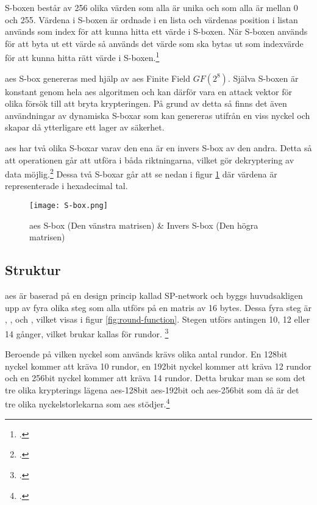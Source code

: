 S-boxen består av 256 olika värden som alla är unika och som alla är mellan 0 och 255.
Värdena i S-boxen är ordnade i en lista och värdenas position i listan används som
index för att kunna hitta ett värde i S-boxen. När S-boxen används för att byta ut
ett värde så används det värde som ska bytas ut som indexvärde för att kunna hitta
rätt värde i S-boxen.\footcite{sbox_wiki}

\acrshort{aes} S-box genereras med hjälp av \acrshort{aes} Finite Field {$GF(2^8)$}.
Själva S-boxen är konstant genom hela \acrshort{aes} algoritmen och kan därför
vara en attack vektor för olika försök till att bryta krypteringen. På grund av
detta så finns det även användningar av dynamiska S-boxar som kan genereras
utifrån en viss nyckel och skapar då ytterligare ett lager av säkerhet.

\acrshort{aes} har två olika S-boxar varav den ena är en invers S-box av den andra.
Detta så att operationen går att utföra i båda riktningarna, vilket gör dekryptering
av data möjlig.\footcite{sbox_wiki} Dessa två S-boxar går att se nedan i figur \ref{fig:aes-sbox} där
värdena är representerade i \gls{hexadecimal} tal.

\begin{figure}[H]
    \texttt{[image: S-box.png]}
    \caption{\acrshort{aes} S-box (Den vänstra matrisen) \& Invers S-box (Den högra matrisen)}
    \label{fig:aes-sbox}
\end{figure}

\subsection{Struktur}
\label{sec:aes-structure}
\acrshort{aes} är baserad på en design princip kallad \gls{SP-network} och byggs huvudsakligen upp av fyra olika steg som alla utförs på en matris av 16 \glspl{byte}. Dessa fyra steg är
, ,  och
, vilket visas i figur \ref{fig:round-function}. Stegen utförs antingen 10, 12 eller 14 gånger, vilket brukar kallas för rundor.
\footcite{daemen1999aes}

Beroende på vilken nyckel som används krävs olika antal rundor.
En 128bit nyckel kommer att kräva 10 rundor, en 192bit nyckel kommer att kräva 12 rundor och en 256bit nyckel kommer att kräva 14 rundor.
Detta brukar man se som det tre olika krypterings lägena \acrshort{aes}-128bit \acrshort{aes}-192bit och \acrshort{aes}-256bit som
då är det tre olika nyckelstorlekarna som \acrshort{aes} stödjer.\footcite{daemen1999aes}

